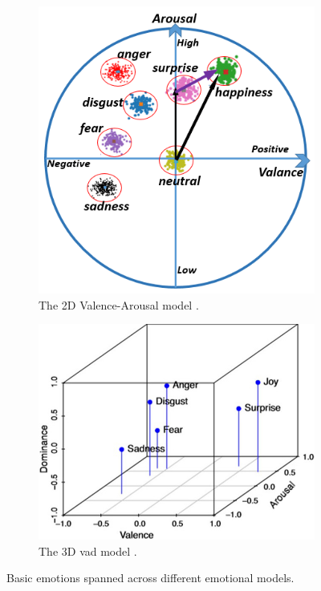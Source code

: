 \begin{figure}
\centering
\begin{subfigure}{.5\textwidth}
  \centering
  \includegraphics[width=.75\linewidth]{figs/2_state_of_the_art/emoValAro.png}
  \caption{The 2D Valence-Arousal model \cite{10.1007/11573548_51}.}
  \label{fig:emoValAro}
\end{subfigure}%
\begin{subfigure}{.5\textwidth}
  \centering
  \includegraphics[width=\linewidth]{figs/2_state_of_the_art/VAD_Emotions.jpg}
  \caption{The 3D \acl{vad} model \cite{VAD_Emotions_article}.}
  \label{fig:emoVAD}
\end{subfigure}
\caption{Basic emotions spanned across different emotional models.}
\end{figure}


